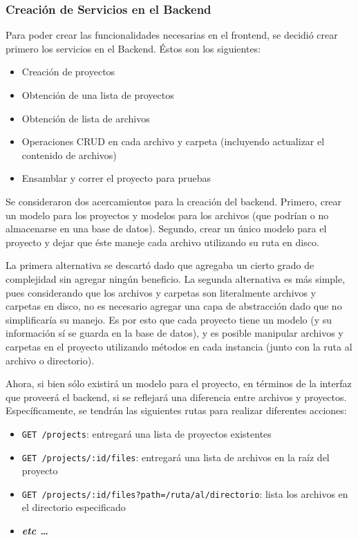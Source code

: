 \documentclass[12pt,titlepage,]{article}
\begin{document}
\subsubsection{Creación de Servicios en el Backend}

Para poder crear las funcionalidades necesarias en el frontend, se
decidió crear primero los servicios en el Backend. Éstos son los
siguientes:

\begin{itemize}
\item
  Creación de proyectos
\item
  Obtención de una lista de proyectos
\item
  Obtención de lista de archivos
\item
  Operaciones CRUD en cada archivo y carpeta (incluyendo actualizar el
  contenido de archivos)
\item
  Ensamblar y correr el proyecto para pruebas
\end{itemize}

Se consideraron dos acercamientos para la creación del backend. Primero,
crear un modelo para los proyectos y modelos para los archivos (que
podrían o no almacenarse en una base de datos). Segundo, crear un único
modelo para el proyecto y dejar que éste maneje cada archivo utilizando
su ruta en disco.

La primera alternativa se descartó dado que agregaba un cierto grado de
complejidad sin agregar ningún beneficio. La segunda alternativa es más
simple, pues considerando que los archivos y carpetas son literalmente
archivos y carpetas en disco, no es necesario agregar una capa de
abstracción dado que no simplificaría su manejo. Es por esto que cada
proyecto tiene un modelo (y su información sí se guarda en la base de
datos), y es posible manipular archivos y carpetas en el proyecto
utilizando métodos en cada instancia (junto con la ruta al archivo o
directorio).

Ahora, si bien sólo existirá un modelo para el proyecto, en términos de
la interfaz que proveerá el backend, si se reflejará una diferencia
entre archivos y proyectos. Específicamente, se tendrán las siguientes
rutas para realizar diferentes acciones:

\begin{itemize}
\item
  \texttt{GET /projects}: entregará una lista de proyectos existentes
\item
  \texttt{GET /projects/:id/files}: entregará una lista de archivos en
  la raíz del proyecto
\item
  \texttt{GET /projects/:id/files?path=/ruta/al/directorio}: lista los
  archivos en el directorio especificado
\item
  \textbf{\emph{etc \ldots{}}}
\end{itemize}
\end{document}
